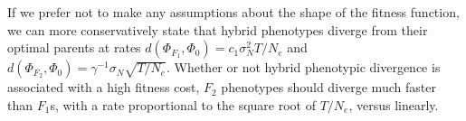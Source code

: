\documentclass{article}
\newcommand{\plr}[1]{\todo[color=blue!25]{#1}}
\newcommand{\js}[1]{\todo[color=green!25]{#1}}
\newcommand{\plr}[1]{{\color{blue}\it #1}}
\newcommand{\1}{\mathbbm{1}}
\newcommand{\Sys}{\mathcal{S}}
\begin{document}
If we prefer not to make any assumptions about the shape of the fitness function, we can more conservatively state that hybrid phenotypes diverge from their optimal parents at rates $d(\Phi_{F_1}, \Phi_0) = c_1 \sigma_N^2 T/N_e$ and $d(\Phi_{F_2}, \Phi_0) = \gamma^{-1} \sigma_N \sqrt{T/N_e}$. Whether or not hybrid phenotypic divergence is associated with a high fitness cost, $F_2$ phenotypes should diverge much faster than $F_1$s, with a rate proportional to the square root of $T/N_e$, versus linearly.


\end{document}
